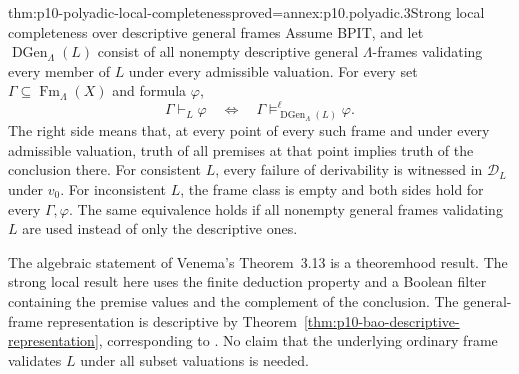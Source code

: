 \begin{hbtheorem}{thm:p10-polyadic-local-completeness}{proved=annex:p10.polyadic.3}{Strong local completeness over descriptive general frames}
Assume BPIT, and let \(\operatorname{DGen}_\Lambda(L)\) consist of
all nonempty descriptive general \(\Lambda\)-frames validating
every member of \(L\) under every admissible valuation.
For every set \(\Gamma\subseteq\operatorname{Fm}_\Lambda(X)\) and
formula \(\varphi\),
\[
 \Gamma\vdash_L\varphi
       \quad\Longleftrightarrow\quad
 \Gamma\models^\ell_{\operatorname{DGen}_\Lambda(L)}\varphi.
\]
The right side means that, at every point of every such frame and
under every admissible valuation, truth of all premises at that
point implies truth of the conclusion there.
For consistent \(L\), every failure of derivability is witnessed
in \(\mathcal D_L\) under \(v_0\).
For inconsistent \(L\), the frame class is empty and both sides
hold for every \(\Gamma,\varphi\).
The same equivalence holds if all nonempty general frames validating
\(L\) are used instead of only the descriptive ones.
\end{hbtheorem}

The algebraic statement of Venema's Theorem~3.13 is a theoremhood
result.  The strong local result here uses the finite deduction
property and a Boolean filter containing the premise values and
the complement of the conclusion.  The general-frame representation
is descriptive by Theorem~\ref{thm:p10-bao-descriptive-representation},
corresponding to \cite[preprint Theorem~5.28, p.~23]{Venema2005Preprint}.
No claim that the underlying ordinary frame validates \(L\) under
all subset valuations is needed.
